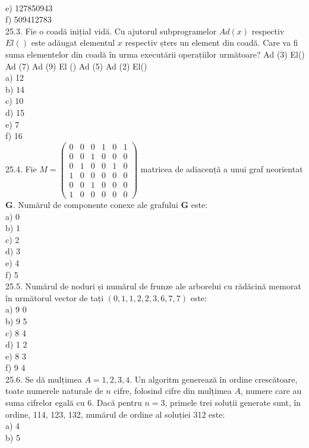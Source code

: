 {{\\
e) 127850943
\\
f) 509412783
\\
25.3. Fie o coadă inițial vidă. Cu ajutorul subprogramelor $Ad(x)$ respectiv $El()$ este adăugat elementul $x$ respectiv șters un element din coadă. Care va fi suma elementelor din coadă în urma executării operațiilor următoare? Ad (3) El() Ad (7) Ad (9) El () Ad (5) Ad (2) El()
\\
a) 12
\\
b) 14
\\
c) 10
\\
d) 15
\\
e) 7
\\
f) 16
\\
25.4. Fie $M=\left(\begin{array}{llllll}0 & 0 & 0 & 1 & 0 & 1 \\ 0 & 0 & 1 & 0 & 0 & 0 \\ 0 & 1 & 0 & 0 & 1 & 0 \\ 1 & 0 & 0 & 0 & 0 & 0 \\ 0 & 0 & 1 & 0 & 0 & 0 \\ 1 & 0 & 0 & 0 & 0 & 0\end{array}\right)$ matricea de adiacenṭă a unui graf neorientat $\mathbf{G}$. Numărul de componente conexe ale grafului $\mathbf{G}$ este:
\\
a) 0
\\
b) 1
\\
c) 2
\\
d) 3
\\
e) 4
\\
f) 5
\\
25.5. Numărul de noduri și numărul de frunze ale arborelui cu rădăcină memorat în următorul vector de tați $(0, 1, 1, 2, 2, 3, 6, 7, 7)$ este:
\\
a) 9 0
\\
b) 9 5
\\
c) 8 4
\\
d) 1 2
\\
e) 8 3
\\
f) 9 4
\\
25.6. Se dă mulțimea $A={1,2,3,4}$. Un algoritm generează în ordine crescătoare, toate numerele naturale de $n$ cifre, folosind cifre din mulțimea $A$, numere care au suma cifrelor egală cu 6. Dacă pentru $n=3$, primele trei soluții generate sunt, în ordine, 114, 123, 132, numărul de ordine al soluției 312 este:
\\
a) 4
\\
b) 5
}}
